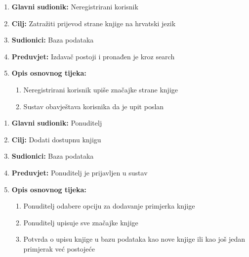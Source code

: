 \documentclass[12pt]{report}
\begin{document}
\noindent {}
\begin{enumerate}
	
	\item \textbf{Glavni sudionik: } Neregistrirani korisnik
	\item  \textbf{Cilj:} Zatražiti prijevod strane knjige na hrvatski jezik
	\item  \textbf{Sudionici:} Baza podataka
	\item  \textbf{Preduvjet:} Izdavač postoji i pronađen je kroz search
	\item  \textbf{Opis osnovnog tijeka:}
	
	\begin{enumerate}
	 
		\item Neregistrirani korisnik upiše značajke strane knjige
		\item Sustav obavještava korisnika da je upit poslan
		
	\end{enumerate}
	
\end{enumerate}

\noindent {}
\begin{enumerate}
	
	\item \textbf{Glavni sudionik: } Ponuditelj
	\item  \textbf{Cilj:} Dodati dostupnu knjigu 
	\item  \textbf{Sudionici:} Baza podataka
	\item  \textbf{Preduvjet:} Ponuditelj je prijavljen u sustav
	\item  \textbf{Opis osnovnog tijeka:}
	
	\begin{enumerate}
		
		\item Ponuditelj odabere opciju za dodavanje primjerka knjige
		\item Ponuditelj upisuje sve značajke knjige   
		\item Potvrda o upisu knjige u bazu podataka kao nove knjige ili kao još jedan primjerak već postojeće
		
	\end{enumerate}
	
\end{enumerate}
\end{document}
